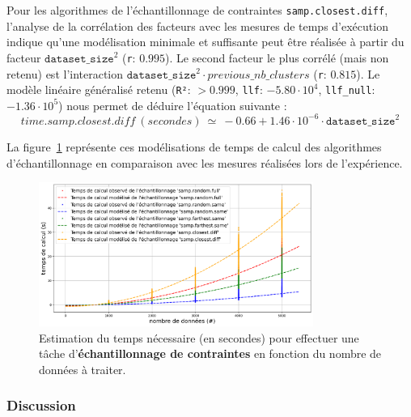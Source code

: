			Pour les algorithmes de l'échantillonnage de contraintes \texttt{samp.closest.diff}, l'analyse de la corrélation des facteurs avec les mesures de temps d'exécution indique qu'une modélisation minimale et suffisante peut être réalisée à partir du facteur $\texttt{dataset\_size}^{2}$ (\texttt{r}: $0.995$).
			Le second facteur le plus corrélé (mais non retenu) est l'interaction $\texttt{dataset\_size}^{2} \cdot previous\_nb\_clusters$ (\texttt{r}: $0.815$).
			Le modèle linéaire généralisé retenu (\texttt{R²}: $> 0.999$, \texttt{llf}: $-5.80 \cdot 10^{4}$, \texttt{llf\_null}: $-1.36 \cdot 10^{5}$) nous permet de déduire l'équation suivante :
			\begin{equation}
				time.samp.closest.diff~(secondes)~
				\simeq~-0.66 + 1.46 \cdot 10^{-6} \cdot \texttt{dataset\_size}^{2}
			\end{equation}
			
			La figure~\ref{figure:4.3.2-ETUDE-COUTS-TEMPS-CALCUL-MODELISATION-SAMPLING} représente ces modélisations de temps de calcul des algorithmes d'échantillonnage en comparaison avec les mesures réalisées lors de l'expérience.
			\newline
			\begin{figure}[!htb]
				\centering
				\includegraphics[width=0.8\textwidth]{figures/etude-temps-calcul-modelisation-4samp}
				\caption{Estimation du temps nécessaire (en secondes) pour effectuer une tâche d'\textbf{échantillonnage de contraintes} en fonction du nombre de données à traiter.}
				\label{figure:4.3.2-ETUDE-COUTS-TEMPS-CALCUL-MODELISATION-SAMPLING}
			\end{figure}

		\subsubsection{Discussion}
		
